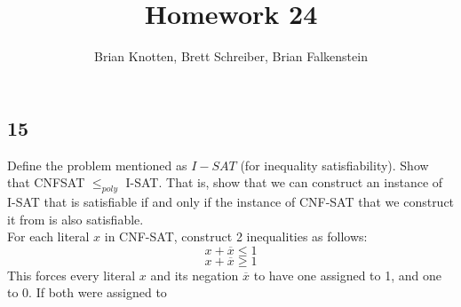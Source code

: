 \documentclass[letterpaper,notitlepage,twoside]{article}
\begin{document}
\title{Homework 24}
\author{Brian Knotten, Brett Schreiber, Brian Falkenstein}
\maketitle
\subsection*{15}
Define the problem mentioned as $I-SAT$ (for inequality satisfiability). Show that CNFSAT $\leq _{poly}$ I-SAT. That is, show that we can construct an instance of I-SAT that is satisfiable if and only if the instance of CNF-SAT that we construct it from is also satisfiable. \\
For each literal $x$ in CNF-SAT, construct 2 inequalities as follows:\\
$$x + \overline x \leq 1$$
$$x + \overline x \geq 1$$
This forces every literal $x$ and its negation $\overline x$ to have one assigned to 1, and one to 0. If both were assigned to  
\end{document}
